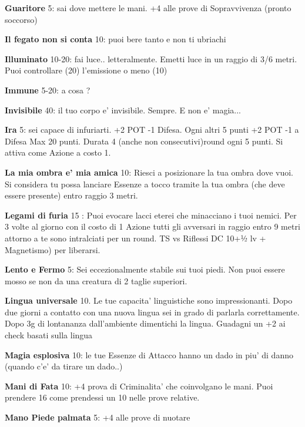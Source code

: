 \documentclass[a4paper,11pt,twoside,openany]{book}
\begin{document}
	\textbf{Guaritore} 5: sai dove mettere le mani. +4 alle prove di Sopravvivenza (pronto soccorso)
	
	\textbf{Il fegato non si conta} 10: puoi bere tanto e non ti ubriachi
	
	\textbf{Illuminato} 10-20: fai luce.. letteralmente. Emetti luce in un raggio di 3/6 metri. Puoi controllare (20) l'emissione o meno (10)
	
	\textbf{Immune} 5-20: a cosa ?
	
	\textbf{Invisibile} 40: il tuo corpo e' invisibile. Sempre. E non e' magia...
	
	\textbf{Ira} 5: sei capace di infuriarti. +2 POT -1 Difesa. Ogni altri 5 punti +2 POT -1 a Difesa Max 20 punti. Durata 4 (anche non consecutivi)round ogni 5 punti. Si attiva come Azione a costo 1.
	
	\textbf{La mia ombra e' mia amica} 10: Riesci a posizionare la tua ombra dove vuoi. Si considera tu possa lanciare Essenze a tocco tramite la tua ombra (che deve essere presente) entro raggio 3 metri.
	
	\textbf{Legami di furia} 15 : Puoi evocare lacci eterei che minacciano i tuoi nemici. Per 3 volte al giorno con il costo di 1 Azione tutti gli avversari in raggio entro 9 metri attorno a te sono intralciati per un round. TS vs Riflessi DC 10+½ lv + Magnetismo) per liberarsi.
	
	\textbf{Lento e Fermo} 5: Sei eccezionalmente stabile sui tuoi piedi. Non puoi essere mosso se non da una creatura di 2 taglie superiori.
	
	\textbf{Lingua universale} 10. Le tue capacita' linguistiche sono impressionanti. Dopo due giorni a contatto con una nuova lingua sei in grado di parlarla correttamente. Dopo 3g di lontananza dall'ambiente dimentichi la lingua. Guadagni un +2 ai check basati sulla lingua
	
	\textbf{Magia esplosiva} 10: le tue Essenze di Attacco hanno un dado in piu' di danno (quando c'e' da tirare un dado..)
	
	\textbf{Mani di Fata} 10: +4 prova di Criminalita' che coinvolgano le mani. Puoi prendere 16 come prendessi un 10 nelle prove relative. 
	
	\textbf{Mano Piede palmata} 5: +4 alle prove di nuotare
	
\end{document}
